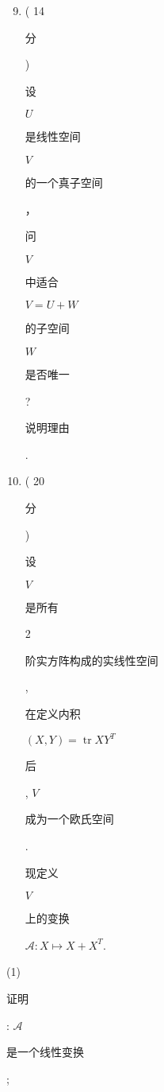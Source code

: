 \documentclass[10pt]{article}
\begin{document}
\begin{enumerate}
  \setcounter{enumi}{8}
  \item ( 14 \begin{CJK}{UTF8}{mj}分\end{CJK}) \begin{CJK}{UTF8}{mj}设\end{CJK} $U$ \begin{CJK}{UTF8}{mj}是线性空间\end{CJK} $V$ \begin{CJK}{UTF8}{mj}的一个真子空间\end{CJK}，\begin{CJK}{UTF8}{mj}问\end{CJK} $V$ \begin{CJK}{UTF8}{mj}中适合\end{CJK} $V=U+W$ \begin{CJK}{UTF8}{mj}的子空间\end{CJK} $W$ \begin{CJK}{UTF8}{mj}是否唯一\end{CJK}? \begin{CJK}{UTF8}{mj}说明理由\end{CJK}.

  \item ( 20 \begin{CJK}{UTF8}{mj}分\end{CJK}) \begin{CJK}{UTF8}{mj}设\end{CJK} $V$ \begin{CJK}{UTF8}{mj}是所有\end{CJK} 2 \begin{CJK}{UTF8}{mj}阶实方阵构成的实线性空间\end{CJK}, \begin{CJK}{UTF8}{mj}在定义内积\end{CJK} $(X, Y)=\operatorname{tr} X Y^{T}$ \begin{CJK}{UTF8}{mj}后\end{CJK}, $V$ \begin{CJK}{UTF8}{mj}成为一个欧氏空间\end{CJK}. \begin{CJK}{UTF8}{mj}现定义\end{CJK} $V$ \begin{CJK}{UTF8}{mj}上的变换\end{CJK} $\mathcal{A}: X \mapsto X+X^{T}$.

\end{enumerate}
(1) \begin{CJK}{UTF8}{mj}证明\end{CJK}: $\mathcal{A}$ \begin{CJK}{UTF8}{mj}是一个线性变换\end{CJK};
\end{document}
